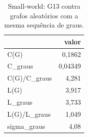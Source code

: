 \begin{table}[htbp]
\centering
\small
\caption{Small-world: G13 contra grafos aleatórios com a mesma sequência de graus.}
\label{tab:05_small_world_graus}
\begin{tabular}{lr}
\toprule
 & valor \\
\midrule
C(G) & 0,1862 \\
C\_graus & 0,04349 \\
C(G)/C\_graus & 4,281 \\
L(G) & 3,917 \\
L\_graus & 3,733 \\
L(G)/L\_graus & 1,049 \\
sigma\_graus & 4,08 \\
\bottomrule
\end{tabular}
\end{table}
